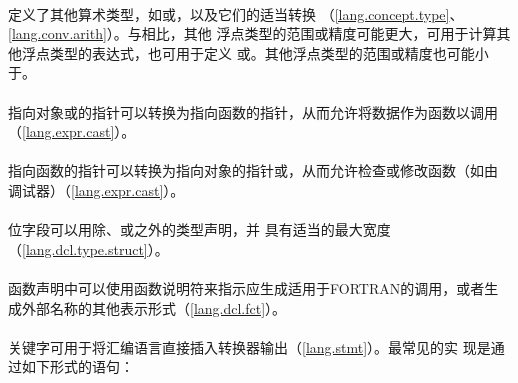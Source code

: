 \paragraph{}
定义了其他算术类型，如或，以及它们的适当转换
（\ref{lang.concept.type}、\ref{lang.conv.arith}）。与相比，其他
浮点类型的范围或精度可能更大，可用于计算其他浮点类型的表达式，也可用于定义
或。其他浮点类型的范围或精度也可能小于。

\paragraph{}
指向对象或的指针可以转换为指向函数的指针，从而允许将数据作为函数以调用
（\ref{lang.expr.cast}）。

\paragraph{}
指向函数的指针可以转换为指向对象的指针或，从而允许检查或修改函数（如由
调试器）（\ref{lang.expr.cast}）。

\paragraph{}
位字段可以用除、或之外的类型声明，并
具有适当的最大宽度（\ref{lang.dcl.type.struct}）。

\paragraph{}
函数声明中可以使用函数说明符来指示应生成适用于FORTRAN的调用，或者生
成外部名称的其他表示形式（\ref{lang.dcl.fct}）。

\paragraph{}
关键字可用于将汇编语言直接插入转换器输出（\ref{lang.stmt}）。最常见的实
现是通过如下形式的语句：                                                      \\
\mbox{\hspace{4em}  \tm{);}}

